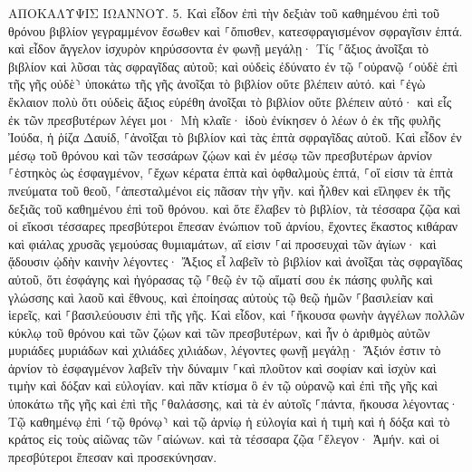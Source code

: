 \documentclass[twoside, 9pt]{extreport}
\begin{document}
ΑΠΟΚΑΛΥΨΙΣ ΙΩΑΝΝΟΥ.
5.
Καὶ εἶδον ἐπὶ τὴν δεξιὰν τοῦ καθημένου ἐπὶ τοῦ θρόνου βιβλίον γεγραμμένον ἔσωθεν καὶ ⸀ὄπισθεν, κατεσφραγισμένον σφραγῖσιν ἑπτά. 
καὶ εἶδον ἄγγελον ἰσχυρὸν κηρύσσοντα ἐν φωνῇ μεγάλῃ· Τίς ⸀ἄξιος ἀνοῖξαι τὸ βιβλίον καὶ λῦσαι τὰς σφραγῖδας αὐτοῦ; 
καὶ οὐδεὶς ἐδύνατο ἐν τῷ ⸀οὐρανῷ ⸂οὐδὲ ἐπὶ τῆς γῆς οὐδὲ⸃ ὑποκάτω τῆς γῆς ἀνοῖξαι τὸ βιβλίον οὔτε βλέπειν αὐτό. 
καὶ ⸀ἐγὼ ἔκλαιον πολὺ ὅτι οὐδεὶς ἄξιος εὑρέθη ἀνοῖξαι τὸ βιβλίον οὔτε βλέπειν αὐτό· 
καὶ εἷς ἐκ τῶν πρεσβυτέρων λέγει μοι· Μὴ κλαῖε· ἰδοὺ ἐνίκησεν ὁ λέων ὁ ἐκ τῆς φυλῆς Ἰούδα, ἡ ῥίζα Δαυίδ, ⸀ἀνοῖξαι τὸ βιβλίον καὶ τὰς ἑπτὰ σφραγῖδας αὐτοῦ. 
Καὶ εἶδον ἐν μέσῳ τοῦ θρόνου καὶ τῶν τεσσάρων ζῴων καὶ ἐν μέσῳ τῶν πρεσβυτέρων ἀρνίον ⸀ἑστηκὸς ὡς ἐσφαγμένον, ⸀ἔχων κέρατα ἑπτὰ καὶ ὀφθαλμοὺς ἑπτά, ⸀οἵ εἰσιν τὰ ἑπτὰ πνεύματα τοῦ θεοῦ, ⸀ἀπεσταλμένοι εἰς πᾶσαν τὴν γῆν. 
καὶ ἦλθεν καὶ εἴληφεν ἐκ τῆς δεξιᾶς τοῦ καθημένου ἐπὶ τοῦ θρόνου. 
καὶ ὅτε ἔλαβεν τὸ βιβλίον, τὰ τέσσαρα ζῷα καὶ οἱ εἴκοσι τέσσαρες πρεσβύτεροι ἔπεσαν ἐνώπιον τοῦ ἀρνίου, ἔχοντες ἕκαστος κιθάραν καὶ φιάλας χρυσᾶς γεμούσας θυμιαμάτων, αἵ εἰσιν ⸀αἱ προσευχαὶ τῶν ἁγίων· 
καὶ ᾄδουσιν ᾠδὴν καινὴν λέγοντες· Ἄξιος εἶ λαβεῖν τὸ βιβλίον καὶ ἀνοῖξαι τὰς σφραγῖδας αὐτοῦ, ὅτι ἐσφάγης καὶ ἠγόρασας τῷ ⸀θεῷ ἐν τῷ αἵματί σου ἐκ πάσης φυλῆς καὶ γλώσσης καὶ λαοῦ καὶ ἔθνους, 
καὶ ἐποίησας αὐτοὺς τῷ θεῷ ἡμῶν ⸀βασιλείαν καὶ ἱερεῖς, καὶ ⸀βασιλεύουσιν ἐπὶ τῆς γῆς. 
Καὶ εἶδον, καὶ ⸀ἤκουσα φωνὴν ἀγγέλων πολλῶν κύκλῳ τοῦ θρόνου καὶ τῶν ζῴων καὶ τῶν πρεσβυτέρων, καὶ ἦν ὁ ἀριθμὸς αὐτῶν μυριάδες μυριάδων καὶ χιλιάδες χιλιάδων, 
λέγοντες φωνῇ μεγάλῃ· Ἄξιόν ἐστιν τὸ ἀρνίον τὸ ἐσφαγμένον λαβεῖν τὴν δύναμιν ⸀καὶ πλοῦτον καὶ σοφίαν καὶ ἰσχὺν καὶ τιμὴν καὶ δόξαν καὶ εὐλογίαν. 
καὶ πᾶν κτίσμα ὃ ἐν τῷ οὐρανῷ καὶ ἐπὶ τῆς γῆς καὶ ὑποκάτω τῆς γῆς καὶ ἐπὶ τῆς ⸀θαλάσσης, καὶ τὰ ἐν αὐτοῖς ⸀πάντα, ἤκουσα λέγοντας· Τῷ καθημένῳ ἐπὶ ⸂τῷ θρόνῳ⸃ καὶ τῷ ἀρνίῳ ἡ εὐλογία καὶ ἡ τιμὴ καὶ ἡ δόξα καὶ τὸ κράτος εἰς τοὺς αἰῶνας τῶν ⸀αἰώνων. 
καὶ τὰ τέσσαρα ζῷα ⸀ἔλεγον· Ἀμήν. καὶ οἱ πρεσβύτεροι ἔπεσαν καὶ προσεκύνησαν. 
\end{document}

